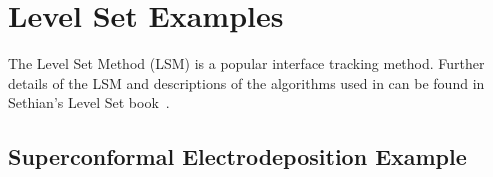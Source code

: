 \documentclass[tocAsPDFpart]{fipy}
\begin{document}



% 
% 
% 
% 



% 



\chapter{Level Set Examples}

The Level Set Method (LSM) is a popular interface tracking
method. Further details of the LSM and descriptions of the algorithms
used in \FiPy{} can be found in Sethian's Level Set
book~\cite{levelSetBook}.


% 

% 



\newpage
\section*{Superconformal Electrodeposition Example}
\end{document}

